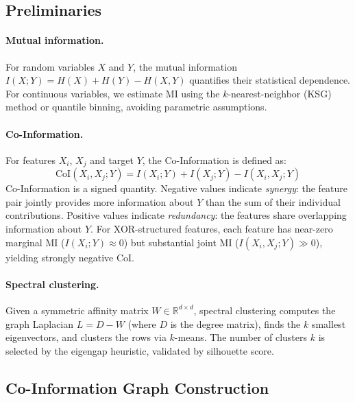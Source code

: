 \documentclass[11pt,letterpaper]{article}
\begin{document}
\subsection{Preliminaries}
\label{sec:preliminaries}

\paragraph{Mutual information.} For random variables $X$ and $Y$, the mutual information $I(X; Y) = H(X) + H(Y) - H(X, Y)$ quantifies their statistical dependence. For continuous variables, we estimate MI using the $k$-nearest-neighbor (KSG) method \citep{Kraskov2004} or quantile binning, avoiding parametric assumptions.

\paragraph{Co-Information.} For features $X_i$, $X_j$ and target $Y$, the Co-Information \citep{McGill1954, Bell2003} is defined as:
\begin{equation}
\text{CoI}(X_i, X_j; Y) = I(X_i; Y) + I(X_j; Y) - I(X_i, X_j; Y)
\label{eq:coi}
\end{equation}
Co-Information is a signed quantity. Negative values indicate \emph{synergy}: the feature pair jointly provides more information about $Y$ than the sum of their individual contributions. Positive values indicate \emph{redundancy}: the features share overlapping information about $Y$. For XOR-structured features, each feature has near-zero marginal MI ($I(X_i; Y) \approx 0$) but substantial joint MI ($I(X_i, X_j; Y) \gg 0$), yielding strongly negative CoI.

\paragraph{Spectral clustering.} Given a symmetric affinity matrix $W \in \mathbb{R}^{d \times d}$, spectral clustering \citep{Luxburg2007} computes the graph Laplacian $L = D - W$ (where $D$ is the degree matrix), finds the $k$ smallest eigenvectors, and clusters the rows via $k$-means. The number of clusters $k$ is selected by the eigengap heuristic, validated by silhouette score.

\subsection{Co-Information Graph Construction}
\label{sec:coi_graph}
\end{document}
